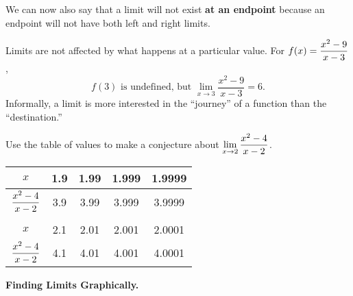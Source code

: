 \documentclass[12pt]{article}
\begin{document}
\vspace{3mm}

We can now also say that a limit will not exist \textbf{at an endpoint} because an endpoint will not have both left and right limits.

\newpage 

Limits are not affected by what happens at a particular value. For $f(x)=\displaystyle\frac{x^2-9}{x-3}$,
$$f(3)\text{ is undefined, but }\lim_{x\to 3}\frac{x^2-9}{x-3}=6.$$
Informally, a limit is more interested in the ``journey'' of a function than the ``destination.''

\vspace{3mm}

\Example Use the table of values to make a conjecture about $\displaystyle\lim_{x\to 2}\frac{x^2-4}{x-2}$.

\vspace{5mm}

\renewcommand{\arraystretch}{2}
\begin{tabular}{ccccc}
\hline
\multicolumn{1}{|c|}{\cellcolor[HTML]{CBCEFB}$x$}    & \multicolumn{1}{c|}{1.9} & \multicolumn{1}{c|}{1.99} & \multicolumn{1}{c|}{1.999} & \multicolumn{1}{c|}{1.9999} \\ \hline
\multicolumn{1}{|c|}{\cellcolor[HTML]{CBCEFB}$\displaystyle\frac{x^2-4}{x-2}$} & \multicolumn{1}{c|}{3.9} & \multicolumn{1}{c|}{3.99} & \multicolumn{1}{c|}{3.999} & \multicolumn{1}{c|}{3.9999} \\ \hline
\multicolumn{1}{l}{}                               & \multicolumn{1}{l}{}     & \multicolumn{1}{l}{}      & \multicolumn{1}{l}{}       & \multicolumn{1}{l}{}        \\ \hline
\multicolumn{1}{|c|}{\cellcolor[HTML]{CBCEFB}$x$}    & \multicolumn{1}{c|}{2.1} & \multicolumn{1}{c|}{2.01} & \multicolumn{1}{c|}{2.001} & \multicolumn{1}{c|}{2.0001} \\ \hline
\multicolumn{1}{|c|}{\cellcolor[HTML]{CBCEFB}$\displaystyle\frac{x^2-4}{x-2}$} & \multicolumn{1}{c|}{4.1} & \multicolumn{1}{c|}{4.01} & \multicolumn{1}{c|}{4.001} & \multicolumn{1}{c|}{4.0001}  \\ \hline
\end{tabular}

\vspace{10mm}

\textbf{Finding Limits Graphically.}

\vspace{5mm}
\end{document}
